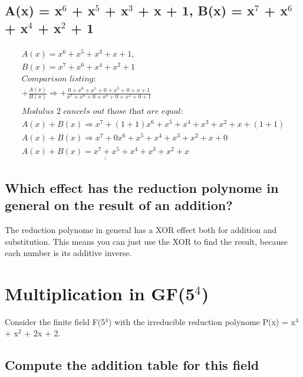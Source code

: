 \subsection{A(x) = x$^{6}$ + x$^{5}$ + x$^{3}$ + x + 1, B(x) = x$^{7}$ + x$^{6}$ + x$^{4}$ + x$^{2}$ + 1}
\label{section:1c}
\begin{equation}
\begin{split}
A(x) = x^{6} + x^{5} + x^{3} + x + 1, \\
B(x) = x^{7} + x^{6} + x^{4} + x^{2} + 1
~ \\
\textit{Comparison listing:} \\
+ \frac{A(x)}{B(x)} \Rightarrow + \frac{0 + x^{6} + x^{5} + 0 + x^{3} + 0 + x + 1}{x^{7} + x^{6} + 0 + x^{4} + 0 + x^{2} + 0 + 1} \\
~ \\
\textit{Modulus 2 cancels out those that are equal:} \\
A (x) + B(x) \Rightarrow x^{7} + (1 + 1)x^{6} + x^{5} + x^{4} +  x^{3} + x^{2} + x + (1 + 1)  \\
A (x) + B(x) \Rightarrow x^{7} + 0x^{6} + x^{5} + x^{4} +  x^{3} + x^{2} + x + 0 \\
\underline{\underline{A (x) + B(x) = x^{7} + x^{5} + x^{4} +  x^{3} + x^{2} + x}}
\end{split}
\end{equation}

\subsection{Which effect has the reduction polynome in general on the result of an addition?}
\label{section:1d}
The reduction polynome in general has a XOR effect both for addition and substitution. 
This means you can just use the XOR to find the result, because each number is its additive inverse.

\section{Multiplication in GF(5$^{4}$)}
Consider the finite field F(5$^{4}$) with the irreducible reduction polynome P(x) = x$^{4}$ + x$^{2}$ + 2x + 2.

\subsection{Compute the addition table for this field}
\label{section:2a}

